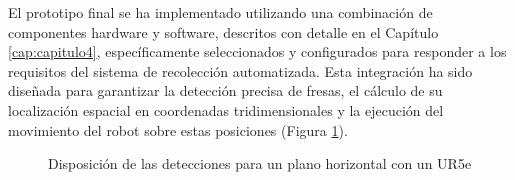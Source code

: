El prototipo final se ha implementado utilizando una combinación de componentes hardware y software, descritos con detalle en el Capítulo \ref{cap:capitulo4}, específicamente seleccionados y configurados para responder a los requisitos del sistema de recolección automatizada. Esta integración ha sido diseñada para garantizar la detección precisa de fresas, el cálculo de su localización espacial en coordenadas tridimensionales y la ejecución del movimiento del robot sobre estas posiciones (Figura \ref{fig:UR5e_planopared}). 

  \begin{figure}[H]
      \begin{center}
        \subcapcentertrue
        \hspace{1mm}
      \end{center}
      \caption{Disposición de las detecciones para un plano horizontal con un UR5e}
      \label{fig:UR5e_planopared}
   \end{figure}

